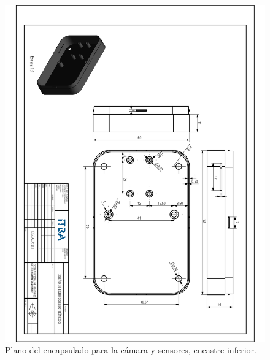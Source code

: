 \begin{figure}[H]
	\centering
	\includegraphics[width=\linewidth]{ImagenesApendice/BasePlano}
	\caption{Plano del encapsulado para la cámara y sensores, encastre inferior.}
	\label{fig:BasePlano}
\end{figure}

